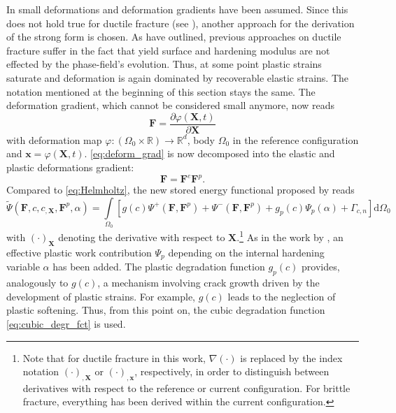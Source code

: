 In  small deformations and deformation gradients have been assumed. Since this does not hold true for ductile fracture (see ), another approach for the derivation of the strong form is chosen. As \citet{03_PF_ductile} have outlined, previous approaches on ductile fracture suffer in the fact that yield surface and hardening modulus are not effected by the phase-field's evolution. Thus, at some point plastic strains saturate and deformation is again dominated by recoverable elastic strains. The notation mentioned at the beginning of this section stays the same. The deformation gradient, which cannot be considered small anymore, now reads
\begin{equation} \label{eq:deform_grad}
	\mathbf{F}=\dfrac{\partial\varphi\left(\mathbf{X},t\right)}{\partial\mathbf{X}}
\end{equation}
with deformation map $\varphi:\left(\Omega_{0}\times\mathbb{R}\right)\rightarrow\mathbb{R}^{d}$, body $\Omega_{0}$ in the reference configuration  and $\mathbf{x}=\varphi\left(\mathbf{X},t\right)$. \eqref{eq:deform_grad} is now decomposed into the elastic and plastic deformations gradient:
\begin{equation} \label{eq:deform_grad_decomp}
	\mathbf{F}=\mathbf{F}^{e}\mathbf{F}^{p}.
\end{equation}
Compared to \eqref{eq:Helmholtz}, the new stored energy functional proposed by \citet{03_PF_ductile} reads
\begin{equation} \label{eq:fctal_ductile}
	\tilde{\Psi}\left(\mathbf{F},c,c_{,\mathbf{X}},\mathbf{F}^{p},\alpha\right) = \int\limits_{\Omega_{0}}\left[g\left(c\right)\Psi^{+}\left(\mathbf{F},\mathbf{F}^{p}\right)+\Psi^{-}\left(\mathbf{F},\mathbf{F}^{p}\right)+g_{p}\left(c\right)\Psi_{p}\left(\alpha\right)+\Gamma_{c,n}\right]\mathrm{d}\Omega_{0}
\end{equation}
with $\left(\cdot\right)_{\mathbf{X}}$ denoting the derivative with respect to $\mathbf{X}$.\footnote{Note that for ductile fracture in this work, $\nabla\left(\cdot\right)$ is replaced by the index notation $\left(\cdot\right)_{,\mathbf{X}}$ or $\left(\cdot\right)_{,\mathbf{x}}$, respectively, in order to distinguish between derivatives with respect to the reference or current configuration. For brittle fracture, everything has been derived within the current configuration.} As in the work by \citet{06_PF_ductile}, an effective plastic work contribution $\Psi_{p}$ depending on the internal hardening variable $\alpha$ has been added. The plastic degradation function $g_{p}\left(c\right)$ provides, analogously to $g\left(c\right)$, a mechanism involving crack growth driven by the development of plastic strains. For example, $g\left(c\right)$ leads to the neglection of plastic softening. Thus, from this point on, the cubic degradation function \eqref{eq:cubic_degr_fct} is used.

